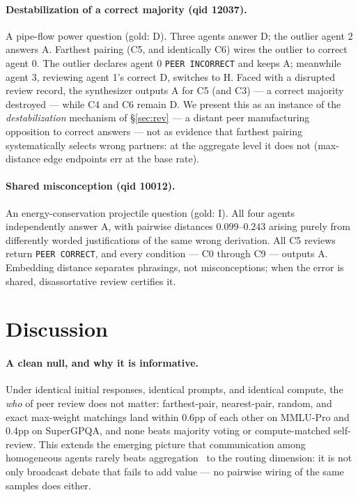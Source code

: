\documentclass[11pt]{article}
\begin{document}
\paragraph{Destabilization of a correct majority (qid 12037).}
A pipe-flow power question (gold: D). Three agents answer D; the outlier agent 2 answers A. Farthest pairing (C5, and identically C6) wires the outlier to correct agent 0. The outlier declares agent 0 \texttt{PEER INCORRECT} and keeps A; meanwhile agent 3, reviewing agent 1's correct D, switches to H. Faced with a disrupted review record, the synthesizer outputs A for C5 (and C3) --- a correct majority destroyed --- while C4 and C6 remain D. We present this as an instance of the \emph{destabilization} mechanism of \S\ref{sec:rev} --- a distant peer manufacturing opposition to correct answers --- not as evidence that farthest pairing systematically selects wrong partners: at the aggregate level it does not (max-distance edge endpoints err at the base rate).

\paragraph{Shared misconception (qid 10012).}
An energy-conservation projectile question (gold: I). All four agents independently answer A, with pairwise distances $0.099$--$0.243$ arising purely from differently worded justifications of the same wrong derivation. All C5 reviews return \texttt{PEER CORRECT}, and every condition --- C0 through C9 --- outputs A. Embedding distance separates phrasings, not misconceptions; when the error is shared, disassortative review certifies it.

\section{Discussion}
\label{sec:discussion}

\paragraph{A clean null, and why it is informative.}
Under identical initial responses, identical prompts, and identical compute, the \emph{who} of peer review does not matter: farthest-pair, nearest-pair, random, and exact max-weight matchings land within 0.6pp of each other on MMLU-Pro and 0.4pp on SuperGPQA, and none beats majority voting or compute-matched self-review. This extends the emerging picture that communication among homogeneous agents rarely beats aggregation~\cite{yang2025revisiting,choi2025debateorvote} to the routing dimension: it is not only broadcast debate that fails to add value --- no pairwise wiring of the same samples does either.
\end{document}
